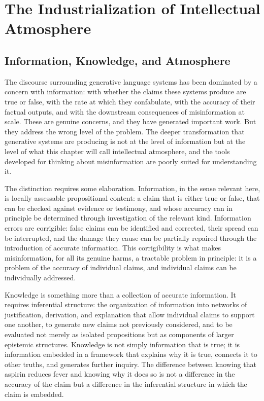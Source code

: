 \documentclass[12pt, openright, twoside]{book}
\begin{document}
\clearpage

\chapter{The Industrialization of Intellectual Atmosphere}

\section{Information, Knowledge, and Atmosphere}

The discourse surrounding generative language systems has been dominated
by a concern with information: with whether the claims these systems
produce are true or false, with the rate at which they confabulate,
with the accuracy of their factual outputs, and with the downstream
consequences of misinformation at scale. These are genuine concerns,
and they have generated important work. But they address the wrong
level of the problem. The deeper transformation that generative systems
are producing is not at the level of information but at the level of
what this chapter will call intellectual atmosphere, and the tools
developed for thinking about misinformation are poorly suited for
understanding it.

The distinction requires some elaboration. Information, in the sense
relevant here, is locally assessable propositional content: a claim
that is either true or false, that can be checked against evidence or
testimony, and whose accuracy can in principle be determined through
investigation of the relevant kind. Information errors are corrigible:
false claims can be identified and corrected, their spread can be
interrupted, and the damage they cause can be partially repaired through
the introduction of accurate information. This corrigibility is what
makes misinformation, for all its genuine harms, a tractable problem
in principle: it is a problem of the accuracy of individual claims,
and individual claims can be individually addressed.

Knowledge is something more than a collection of accurate information.
It requires inferential structure: the organization of information
into networks of justification, derivation, and explanation that allow
individual claims to support one another, to generate new claims not
previously considered, and to be evaluated not merely as isolated
propositions but as components of larger epistemic structures. Knowledge
is not simply information that is true; it is information embedded in
a framework that explains why it is true, connects it to other truths,
and generates further inquiry. The difference between knowing that
aspirin reduces fever and knowing why it does so is not a difference
in the accuracy of the claim but a difference in the inferential
structure in which the claim is embedded.
\end{document}
